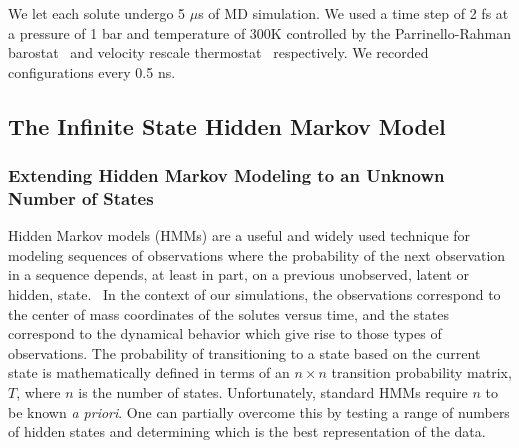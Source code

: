\documentclass[journal=jpcbfk,manuscript=article]{achemso}
\begin{document}
  We let each solute undergo 5 $\mu$s of MD simulation. We used a time step of 2 fs
  at a pressure of 1 bar and temperature of 300K controlled by the Parrinello-Rahman 
  barostat~\cite{parrinello_polymorphic_1981} and velocity rescale 
  thermostat~\cite{bussi_canonical_2007} respectively. We recorded configurations every 0.5 ns.

  \subsection{The Infinite State Hidden Markov Model}\label{method:IHMM}

  \subsubsection*{Extending Hidden Markov Modeling to an Unknown Number of States}
  
  Hidden Markov models (HMMs) are a useful and widely used technique for modeling
  sequences of observations where the probability of the next observation in a 
  sequence depends, at least in part, on a previous unobserved, latent or hidden,
  state.~\cite{beal_infinite_2002} In the context of our simulations, the observations
  correspond to the center of mass coordinates of the solutes versus time, and the
  states correspond to the dynamical behavior which give rise to those types
  of observations. The probability of transitioning to a state based on the current
  state is mathematically defined in terms of an $n\times n$ transition probability
  matrix, $T$, where $n$ is the number of states. Unfortunately, standard HMMs 
  require $n$ to be known \textit{a priori}. One can partially overcome this by 
  testing a range of numbers of hidden states and determining which is the best 
  representation of the data.~\cite{pohle_selecting_2017}
  
\end{document}
